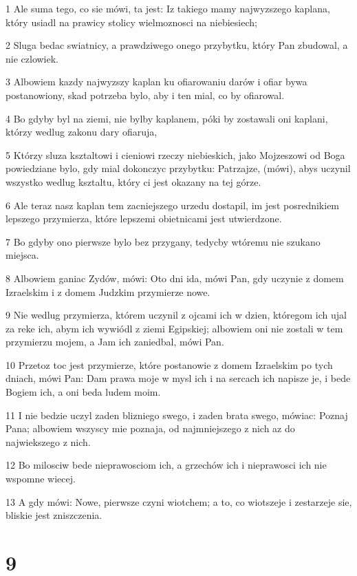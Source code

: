\par 1 Ale suma tego, co sie mówi, ta jest: Iz takiego mamy najwyzszego kaplana, który usiadl na prawicy stolicy wielmoznosci na niebiesiech;
\par 2 Sluga bedac swiatnicy, a prawdziwego onego przybytku, który Pan zbudowal, a nie czlowiek.
\par 3 Albowiem kazdy najwyzszy kaplan ku ofiarowaniu darów i ofiar bywa postanowiony, skad potrzeba bylo, aby i ten mial, co by ofiarowal.
\par 4 Bo gdyby byl na ziemi, nie bylby kaplanem, póki by zostawali oni kaplani, którzy wedlug zakonu dary ofiaruja,
\par 5 Którzy sluza ksztaltowi i cieniowi rzeczy niebieskich, jako Mojzeszowi od Boga powiedziane bylo, gdy mial dokonczyc przybytku: Patrzajze, (mówi), abys uczynil wszystko wedlug ksztaltu, który ci jest okazany na tej górze.
\par 6 Ale teraz nasz kaplan tem zacniejszego urzedu dostapil, im jest posrednikiem lepszego przymierza, które lepszemi obietnicami jest utwierdzone.
\par 7 Bo gdyby ono pierwsze bylo bez przygany, tedycby wtóremu nie szukano miejsca.
\par 8 Albowiem ganiac Zydów, mówi: Oto dni ida, mówi Pan, gdy uczynie z domem Izraelskim i z domem Judzkim przymierze nowe.
\par 9 Nie wedlug przymierza, którem uczynil z ojcami ich w dzien, któregom ich ujal za reke ich, abym ich wywiódl z ziemi Egipskiej; albowiem oni nie zostali w tem przymierzu mojem, a Jam ich zaniedbal, mówi Pan.
\par 10 Przetoz toc jest przymierze, które postanowie z domem Izraelskim po tych dniach, mówi Pan: Dam prawa moje w mysl ich i na sercach ich napisze je, i bede Bogiem ich, a oni beda ludem moim.
\par 11 I nie bedzie uczyl zaden blizniego swego, i zaden brata swego, mówiac: Poznaj Pana; albowiem wszyscy mie poznaja, od najmniejszego z nich az do najwiekszego z nich.
\par 12 Bo milosciw bede nieprawosciom ich, a grzechów ich i nieprawosci ich nie wspomne wiecej.
\par 13 A gdy mówi: Nowe, pierwsze czyni wiotchem; a to, co wiotszeje i zestarzeje sie, bliskie jest zniszczenia.

\chapter{9}

